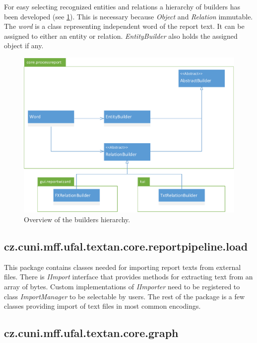 For easy selecting recognized entities and relations a hierarchy of builders
has been developed (see \ref{fig:Builders}). This is necessary because
\emph{Object} and \emph{Relation} immutable. The \emph{word} is a class
representing independent word of the report text. It can be assigned to either
an entity or relation. \emph{EntityBuilder} also holds the assigned object if
any.

\begin{figure}[!htb]
        \centering
        \includegraphics[width=\textwidth]{Images/Builders}
        \caption{Overview of the builders hierarchy.}
        \label{fig:Builders}
\end{figure}

\subsection{cz.cuni.mff.ufal.textan.core.reportpipeline.load}

This package contains classes needed for importing report texts from external
files. There is \emph{IImport} interface that provides methods for extracting
text from an array of bytes. Custom implementations of \emph{IImporter} need
to be registered to class \emph{ImportManager} to be selectable by users. The
rest of the package is a few classes providing import of text files in most
common encodings.

\subsection{cz.cuni.mff.ufal.textan.core.graph}

